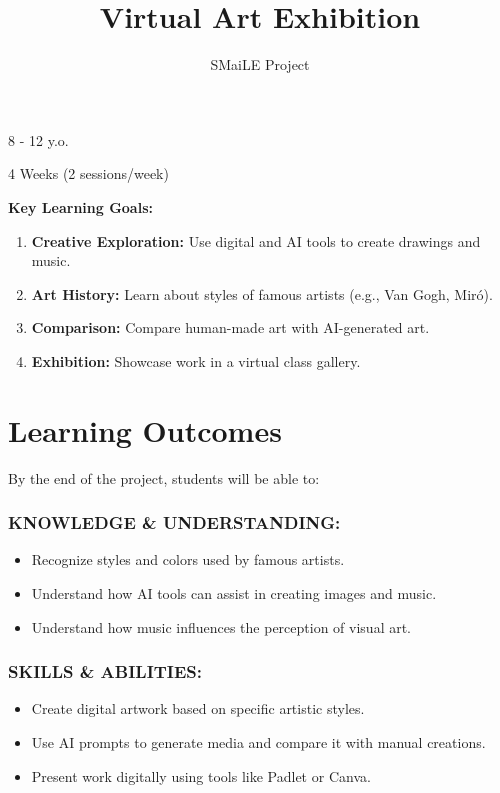 \documentclass[11pt, a4paper]{article}
\begin{document}
\title{\textbf{\color{SmailePink}Virtual Art Exhibition}}
\author{SMaiLE Project}
\date{}
\maketitle
\thispagestyle{plain}

\begin{keyinfobox}
    \begin{description}[leftmargin=*, labelindent=0pt]
        \item[\bfseries\color{SmailePink} Target Group:] 8 - 12 y.o.
        \item[\bfseries\color{SmailePink} Duration:] 4 Weeks (2 sessions/week)
    \end{description}
    \textbf{Key Learning Goals:}
    \begin{enumerate}
        \item \textbf{Creative Exploration:} Use digital and AI tools to create drawings and music.
        \item \textbf{Art History:} Learn about styles of famous artists (e.g., Van Gogh, Miró).
        \item \textbf{Comparison:} Compare human-made art with AI-generated art.
        \item \textbf{Exhibition:} Showcase work in a virtual class gallery.
    \end{enumerate}
\end{keyinfobox}

\section*{Learning Outcomes}
By the end of the project, students will be able to:

\subsubsection*{KNOWLEDGE \& UNDERSTANDING:}
\begin{itemize}
    \item Recognize styles and colors used by famous artists.
    \item Understand how AI tools can assist in creating images and music.
    \item Understand how music influences the perception of visual art.
\end{itemize}

\subsubsection*{SKILLS \& ABILITIES:}
\begin{itemize}
    \item Create digital artwork based on specific artistic styles.
    \item Use AI prompts to generate media and compare it with manual creations.
    \item Present work digitally using tools like Padlet or Canva.
\end{itemize}
\end{document}

